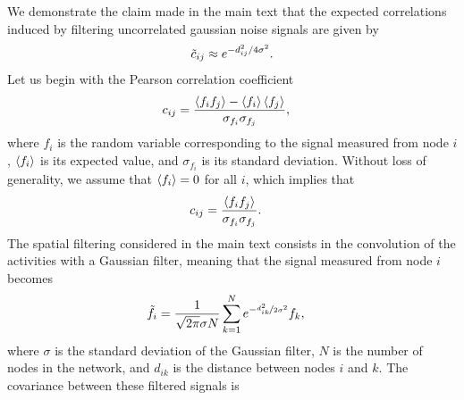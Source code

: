 \documentclass{article}
\begin{document}
We demonstrate the claim made in the main text that the expected correlations induced by filtering uncorrelated gaussian noise signals are given by
\begin{align*}
    \Tilde{c}_{ij} \approx e^{-d_{ij}^2/4\sigma^2}.
\end{align*}
Let us begin with the Pearson correlation coefficient
\begin{align*}
    c_{ij} & = \frac{\expval{f_if_j}-\expval{f_i}\expval{f_j}}{\sigma_{f_i}\sigma_{f_j}},
\end{align*}
where $f_i$ is the random variable corresponding to the signal measured from node $i$, $\expval{f_i}$ is its expected value, and $\sigma_{f_i}$ is its standard deviation.
Without loss of generality, we assume that $\expval{f_i} = 0$ for all $i$, which implies that
\begin{align}
    c_{ij} & = \frac{\expval{f_if_j}}{\sigma_{f_i}\sigma_{f_j}} .
    \label{eq:centered-correlation}
\end{align}
The spatial filtering considered in the main text consists in the convolution of the activities with a Gaussian filter, meaning that the signal measured from node $i$ becomes
\begin{align*}
    \Tilde{f}_i &= \frac{1}{\sqrt{2\pi}\sigma N}\sum_{k=1}^N e^{-\nicefrac{d_{ik}^2}{2\sigma^2}}f_k,
\end{align*}
where $\sigma$ is the standard deviation of the Gaussian filter, $N$ is the number of nodes in the network, and $d_{ik}$ is the distance between nodes $i$ and $k$.
The covariance between these filtered signals is
\end{document}

